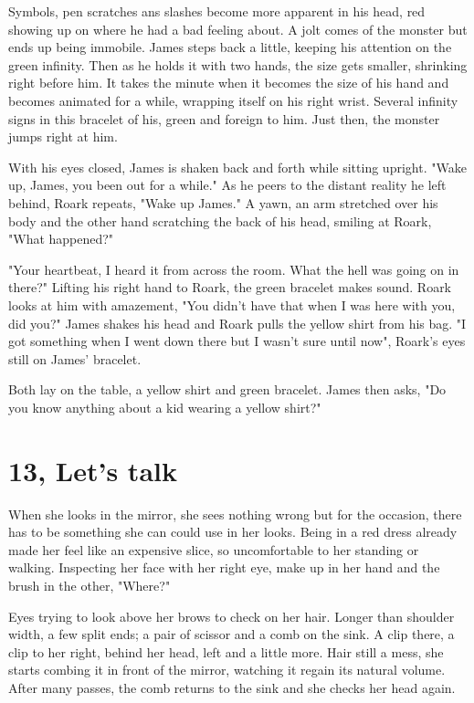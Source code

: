         Symbols, pen scratches ans slashes become more apparent in his head, red showing up on where he had a bad feeling about. A jolt comes
    of the monster but ends up being immobile. James steps back a little, keeping his attention on the green infinity. Then as he holds it with
    two hands, the size gets smaller, shrinking right before him. It takes the minute when it becomes the size of his hand and becomes animated
    for a while, wrapping itself on his right wrist. Several infinity signs in this bracelet of his, green and foreign to him. Just then, the 
    monster jumps right at him.

        With his eyes closed, James is shaken back and forth while sitting upright. "Wake up, James, you been out for a while." As he peers to
    the distant reality he left behind, Roark repeats, "Wake up James." A yawn, an arm stretched over his body and the other hand scratching
    the back of his head, smiling at Roark, "What happened?"

        "Your heartbeat, I heard it from across the room. What the hell was going on in there?" Lifting his right hand to Roark, the green 
    bracelet makes sound. Roark looks at him with amazement, "You didn't have that when I was here with you, did you?" James shakes his head
    and Roark pulls the yellow shirt from his bag. "I got something when I went down there but I wasn't sure until now", Roark's eyes still
    on James' bracelet. 

        Both lay on the table, a yellow shirt and green bracelet. James then asks, "Do you know anything about a kid wearing a yellow shirt?"

\section{13, Let's talk}

        When she looks in the mirror, she sees nothing wrong but for the occasion, there has to be something she can could use in her looks. 
    Being in a red dress already made her feel like an expensive slice, so uncomfortable to her standing or walking. Inspecting her face with
    her right eye, make up in her hand and the brush in the other, "Where?"

        Eyes trying to look above her brows to check on her hair. Longer than shoulder width, a few split ends; a pair of scissor and a comb 
    on the sink. A clip there, a clip to her right, behind her head, left and a little more. Hair still a mess, she starts combing it in front
    of the mirror, watching it regain its natural volume. After many passes, the comb returns to the sink and she checks her head again.

